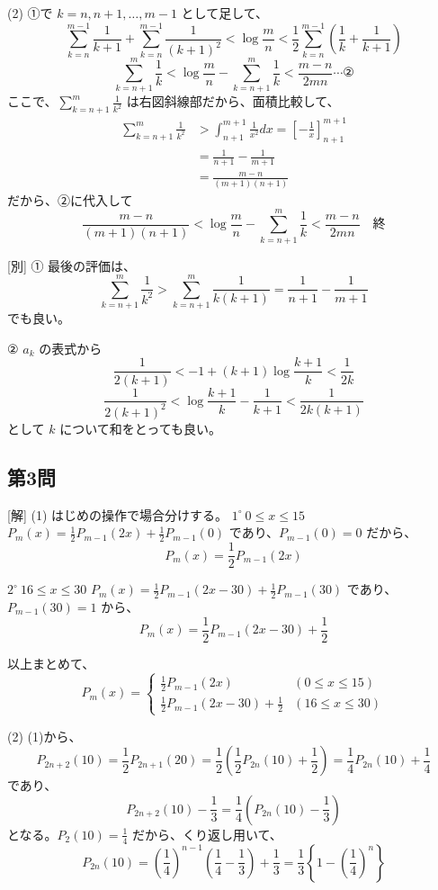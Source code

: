 \documentclass[../main.tex]{subfiles}
\begin{document}
(2) ①で $k=n, n+1, \dots, m-1$ として足して、
\[ \sum_{k=n}^{m-1} \frac{1}{k+1} + \sum_{k=n}^{m-1} \frac{1}{(k+1)^2} < \log\frac{m}{n} < \frac{1}{2}\sum_{k=n}^{m-1}\left(\frac{1}{k} + \frac{1}{k+1}\right) \]
\[ \sum_{k=n+1}^{m} \frac{1}{k} < \log\frac{m}{n} - \sum_{k=n+1}^{m} \frac{1}{k} < \frac{m-n}{2mn} \cdots \text{②} \]
ここで、$\sum_{k=n+1}^{m} \frac{1}{k^2}$ は右図斜線部だから、面積比較して、
\begin{align*}
  \sum_{k=n+1}^{m} \frac{1}{k^2} &> \int_{n+1}^{m+1} \frac{1}{x^2} dx = \left[ -\frac{1}{x} \right]_{n+1}^{m+1} \\
  &= \frac{1}{n+1} - \frac{1}{m+1} \\
  &= \frac{m-n}{(m+1)(n+1)}
\end{align*}
だから、②に代入して
\[ \frac{m-n}{(m+1)(n+1)} < \log\frac{m}{n} - \sum_{k=n+1}^{m} \frac{1}{k} < \frac{m-n}{2mn} \quad \text{終} \]

[別]
① 最後の評価は、
\[ \sum_{k=n+1}^{m} \frac{1}{k^2} > \sum_{k=n+1}^{m} \frac{1}{k(k+1)} = \frac{1}{n+1} - \frac{1}{m+1} \]
でも良い。

② $a_k$ の表式から
\[ \frac{1}{2(k+1)} < -1 + (k+1)\log\frac{k+1}{k} < \frac{1}{2k} \]
\[ \frac{1}{2(k+1)^2} < \log\frac{k+1}{k} - \frac{1}{k+1} < \frac{1}{2k(k+1)} \]
として $k$ について和をとっても良い。

\subsection*{第3問}
[解] (1) はじめの操作で場合分けする。
$1^\circ \ 0 \le x \le 15$
$P_m(x) = \frac{1}{2} P_{m-1}(2x) + \frac{1}{2} P_{m-1}(0)$ であり、$P_{m-1}(0) = 0$ だから、
\[ P_m(x) = \frac{1}{2} P_{m-1}(2x) \]

$2^\circ \ 16 \le x \le 30$
$P_m(x) = \frac{1}{2} P_{m-1}(2x-30) + \frac{1}{2} P_{m-1}(30)$ であり、$P_{m-1}(30) = 1$ から、
\[ P_m(x) = \frac{1}{2} P_{m-1}(2x-30) + \frac{1}{2} \]

以上まとめて、
\[ P_m(x) =
  \begin{cases} \frac{1}{2} P_{m-1}(2x) & (0 \le x \le 15) \\ \frac{1}{2} P_{m-1}(2x-30) + \frac{1}{2} & (16 \le x \le 30)
\end{cases} \]

(2) (1)から、
\[ P_{2n+2}(10) = \frac{1}{2} P_{2n+1}(20) = \frac{1}{2}\left(\frac{1}{2} P_{2n}(10) + \frac{1}{2}\right) = \frac{1}{4} P_{2n}(10) + \frac{1}{4} \]
であり、
\[ P_{2n+2}(10) - \frac{1}{3} = \frac{1}{4} \left(P_{2n}(10) - \frac{1}{3}\right) \]
となる。$P_2(10) = \frac{1}{4}$ だから、くり返し用いて、
\[ P_{2n}(10) = \left(\frac{1}{4}\right)^{n-1} \left(\frac{1}{4} - \frac{1}{3}\right) + \frac{1}{3} = \frac{1}{3} \left\{ 1 - \left(\frac{1}{4}\right)^n \right\} \]
\end{document}

